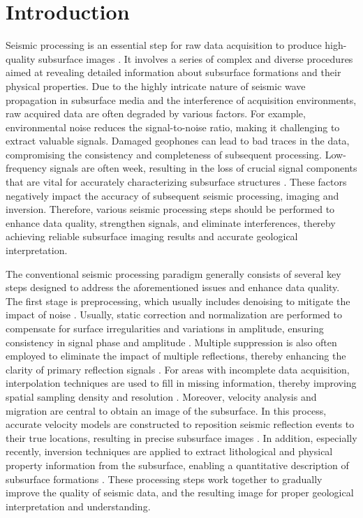 \section{Introduction}
Seismic processing is an essential step for raw data acquisition to produce high-quality subsurface images \citep{yilmaz2001seismic}. It involves a series of complex and diverse procedures aimed at revealing detailed information about subsurface formations and their physical properties. Due to the highly intricate nature of seismic wave propagation in subsurface media and the interference of acquisition environments, raw acquired data are often degraded by various factors. For example, environmental noise reduces the signal-to-noise ratio, making it challenging to extract valuable signals. Damaged geophones can lead to bad traces in the data, compromising the consistency and completeness of subsequent processing. Low-frequency signals are often week, resulting in the loss of crucial signal components that are vital for accurately characterizing subsurface structures \citep{virieux2009overview}. These factors negatively impact the accuracy of subsequent seismic processing, imaging and inversion. Therefore, various seismic processing steps should be performed to enhance data quality, strengthen signals, and eliminate interferences, thereby achieving reliable subsurface imaging results and accurate geological interpretation. 

The conventional seismic processing paradigm generally consists of several key steps designed to address the aforementioned issues and enhance data quality. The first stage is preprocessing, which usually includes denoising to mitigate the impact of noise \citep{abma1995lateral, krohn2008introduction, chen2014random, chen2015random, liu2015signal}. Usually, static correction and normalization are performed to compensate for surface irregularities and variations in amplitude, ensuring consistency in signal phase and amplitude \citep{cox1999static}. Multiple suppression is also often employed to eliminate the impact of multiple reflections, thereby enhancing the clarity of primary reflection signals \citep{verschuur1992adaptive, lopez2015closed}. For areas with incomplete data acquisition, interpolation techniques are used to fill in missing information, thereby improving spatial sampling density and resolution \citep{spitz1991seismic, wang2002seismic, chen2019interpolation}. Moreover, velocity analysis \citep{alkhalifah1995velocity, symes2008migration, fomel2009velocity} and migration \citep{baysal1983reverse, chang1987elastic, zhang2015stable} are central to obtain an image of the subsurface. In this process, accurate velocity models are constructed to reposition seismic reflection events to their true locations, resulting in precise subsurface images \citep{etgen2009overview}. In addition, especially recently, inversion techniques are applied to extract lithological and physical property information from the subsurface, enabling a quantitative description of subsurface formations \citep{tarantola1984inversion, tarantola1986strategy, alkhalifah2014tomography}. These processing steps work together to gradually improve the quality of seismic data, and the resulting image for proper geological interpretation and understanding. 


